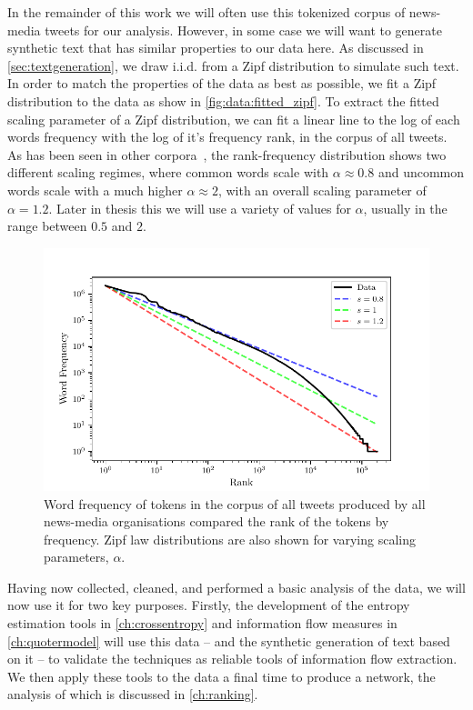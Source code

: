 In the remainder of this work we will often use this tokenized corpus of news-media tweets for our analysis. However, in some case we will want to generate synthetic text that has similar properties to our data here. As discussed in \autoref{sec:textgeneration}, we draw i.i.d. from a Zipf distribution to simulate such text. In order to match the properties of the data as best as possible, we fit a Zipf distribution to the data as show in \autoref{fig:data:fitted_zipf}. To extract the fitted scaling parameter of a Zipf distribution, we can fit a linear line to the log of each words frequency with the log of it's frequency rank, in the corpus of all tweets. As has been seen in other corpora~\cite{williams_text_2015}, the rank-frequency distribution shows two different scaling regimes, where common words scale with $\alpha\approx 0.8$ and uncommon words scale with a much higher $\alpha \approx 2$, with an overall scaling parameter of $\alpha=1.2$. Later in thesis this we will use a variety of values for $\alpha$, usually in the range between $0.5$ and $2$.


\begin{figure}[!htbp]
\centering
\includegraphics{chapter1/figs/fitted_zipf.pdf}
\caption{Word frequency of tokens in the corpus of all tweets produced by all news-media organisations compared the rank of the tokens by frequency. Zipf law distributions are also shown for varying scaling parameters, $\alpha$. \label{fig:data:fitted_zipf}}
\end{figure} 


Having now collected, cleaned, and performed a basic analysis of the data, we will now use it for two key purposes. Firstly, the development of the entropy estimation tools in \autoref{ch:crossentropy} and information flow measures in \autoref{ch:quotermodel} will use this data -- and the synthetic generation of text based on it -- to validate the techniques as reliable tools of information flow extraction. We then apply these tools to the data a final time to produce a network, the analysis of which is discussed in \autoref{ch:ranking}.


%
